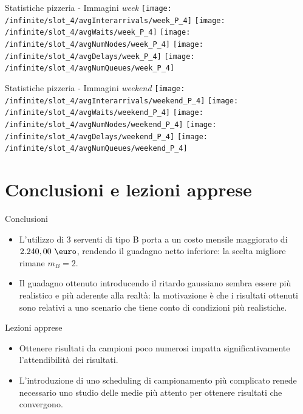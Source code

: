 \documentclass[xcolor=table]{beamer}
\begin{document}
\begin{frame}{Statistiche pizzeria - Immagini \textit{week}}\justifying
\centering
\texttt{[image: /infinite/slot\_4/avgInterarrivals/week\_P\_4]}
\texttt{[image: /infinite/slot\_4/avgWaits/week\_P\_4]}
\texttt{[image: /infinite/slot\_4/avgNumNodes/week\_P\_4]}
\texttt{[image: /infinite/slot\_4/avgDelays/week\_P\_4]}
\texttt{[image: /infinite/slot\_4/avgNumQueues/week\_P\_4]}
\end{frame}
\begin{frame}{Statistiche pizzeria - Immagini \textit{weekend}}\justifying
\centering
\texttt{[image: /infinite/slot\_4/avgInterarrivals/weekend\_P\_4]}
\texttt{[image: /infinite/slot\_4/avgWaits/weekend\_P\_4]}
\texttt{[image: /infinite/slot\_4/avgNumNodes/weekend\_P\_4]}
\texttt{[image: /infinite/slot\_4/avgDelays/weekend\_P\_4]}
\texttt{[image: /infinite/slot\_4/avgNumQueues/weekend\_P\_4]}
\end{frame}



\section{Conclusioni e lezioni apprese}

\begin{frame}{Conclusioni}\justifying

\begin{itemize}
\item L'utilizzo di 3 serventi di tipo B porta a un costo mensile maggiorato di $2.240,00\ \mbox{\euro}$, rendendo il guadagno netto inferiore: la scelta migliore rimane $m_B = 2$.

\item Il guadagno ottenuto introducendo il ritardo gaussiano sembra essere più realistico e più aderente alla realtà: la motivazione è che i risultati ottenuti sono relativi a uno scenario che tiene conto di condizioni più realistiche.
\end{itemize}
\end{frame}

\begin{frame}{Lezioni apprese}\justifying
\begin{itemize}
\item Ottenere risultati da campioni poco numerosi impatta significativamente l'attendibilità dei risultati.

\item L'introduzione di uno scheduling di campionamento più complicato renede necessario uno studio delle medie più attento per ottenere risultati che convergono.

\end{itemize}
\end{frame}
\end{document}
